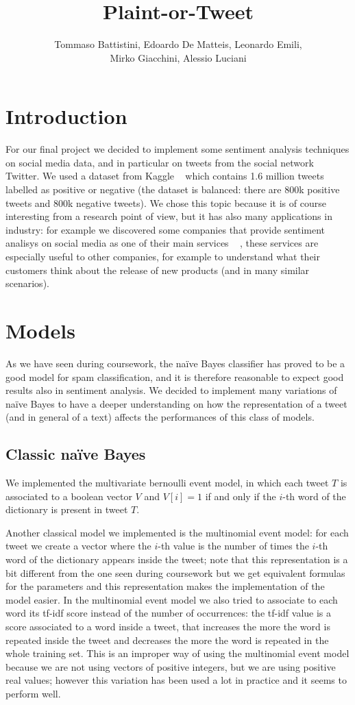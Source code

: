 \documentclass{article}
\title{Plaint-or-Tweet}
\author{Tommaso Battistini, Edoardo De Matteis, Leonardo Emili, \\
Mirko Giacchini, Alessio Luciani}
\begin{document}
    \maketitle
    
    \section*{Introduction}
    For our final project we decided to implement some sentiment analysis techniques on social media data, and in particular on tweets from the social network Twitter. We used a dataset from Kaggle ~\cite{data:sentiment140} which contains 1.6 million tweets labelled as positive or negative (the dataset is balanced: there are 800k positive tweets and 800k negative tweets). We chose this topic because it is of course interesting from a research point of view, but it has also many applications in industry: for example we discovered some companies that provide sentiment analisys on social media as one of their main services ~\cite{startups:spiketrap} , these services are especially useful to other companies, for example to understand what their customers think about the release of new products (and in many similar scenarios). 

    \section*{Models}
    As we have seen during coursework, the na\"ive Bayes classifier has proved to be a good model for spam classification, and it is therefore reasonable to expect good results also in sentiment analysis. We decided to implement many variations of na\"ive Bayes to have a deeper understanding on how the representation of a tweet (and in general of a text) affects the performances of this class of models.
    \subsection*{Classic na\"ive Bayes}
    We implemented the multivariate bernoulli event model, in which each tweet $T$ is associated to a boolean vector $V$ and $V[i]=1$ if and only if the $i$-th word of the dictionary is present in tweet $T$.
    
    Another classical model we implemented is the multinomial event model: for each tweet we create a vector where the $i$-th value is the number of times the $i$-th word of the dictionary appears inside the tweet; note that this representation is a bit different from the one seen during coursework but we get equivalent formulas for the parameters and this representation makes the implementation of the model easier. In the multinomial event model we also tried to associate to each word its tf-idf score instead of the number of occurrences: the tf-idf value is a score associated to a word inside a tweet, that increases the more the word is repeated inside the tweet and decreases the more the word is repeated in the whole training set. This is an improper way of using the multinomial event model because we are not using vectors of positive integers, but we are using positive real values; however this variation has been used a lot in practice and it seems to perform well.
    
\end{document}
